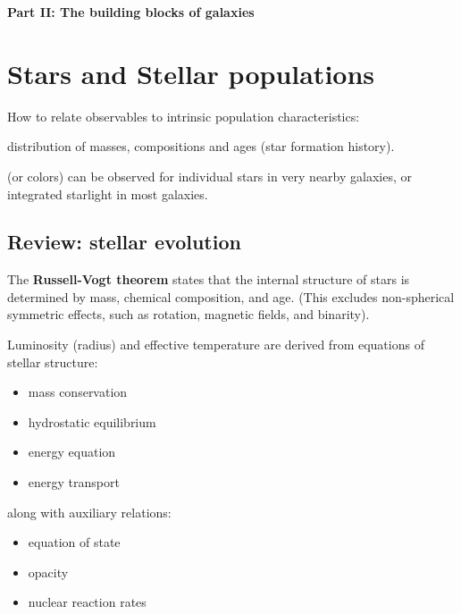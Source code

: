 \documentclass{article}
\begin{document}
\newpage
\begin{center}
    \fontsize{20}{22}\selectfont\textbf{Part II: The building blocks of galaxies}
\end{center}

\section{Stars and Stellar populations}
How to relate observables to intrinsic population characteristics:
\begin{description}[labelwidth=14em, leftmargin=18em]
    \item [Population characteristics:] distribution of masses, compositions
        and ages (star formation history).
    \item [Stellar SEDs] (or colors) can be observed for
        individual stars in very nearby galaxies, or integrated starlight
        in most galaxies.
\end{description}

\subsection{Review: stellar evolution}
The \textbf{Russell-Vogt theorem} states that the
internal structure of stars is determined by mass, chemical
composition, and age. (This excludes
non-spherical symmetric effects, such as rotation, magnetic
fields, and binarity).

Luminosity (radius) and effective temperature are derived from
equations of stellar structure:
\begin{itemize}
    \item mass conservation
    \item hydrostatic equilibrium
    \item energy equation
    \item energy transport
\end{itemize}
along with auxiliary relations:
\begin{itemize}
    \item equation of state
    \item opacity
    \item nuclear reaction rates
\end{itemize}
\end{document}
